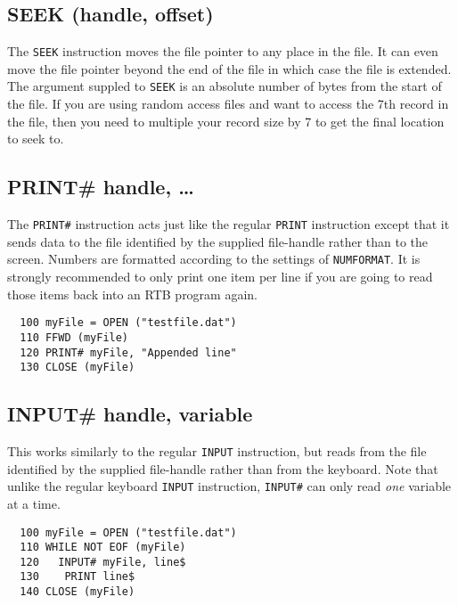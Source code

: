\subsection*{SEEK (handle, offset)}
The {\tt SEEK} instruction moves the file pointer to any place in the
file. It can even move the file pointer beyond the end of the file in
which case the file is extended. The argument suppled to {\tt SEEK}
is an absolute number of bytes from the start of the file. If you are
using random access files and want to access the 7th record in the file,
then you need to multiple your record size by 7 to get the final location
to seek to.

\subsection*{PRINT\# handle, \dots}
The {\tt PRINT\#} instruction acts just like the regular {\tt PRINT}
instruction except that it sends data to the file identified by the
supplied file-handle rather than to the screen. Numbers are formatted
according to the settings of {\tt NUMFORMAT}. It is strongly recommended
to only print one item per line if you are going to read those items
back into an RTB program again.
\begin{verbatim}
  100 myFile = OPEN ("testfile.dat")
  110 FFWD (myFile)
  120 PRINT# myFile, "Appended line"
  130 CLOSE (myFile)
\end{verbatim}

\subsection*{INPUT\# handle, variable}
This works similarly to the regular {\tt INPUT} instruction, but reads
from the file identified by the supplied file-handle rather than from the
keyboard. Note that unlike the regular keyboard {\tt INPUT} instruction,
{\tt INPUT\#} can only read {\em one} variable at a time.
\begin{verbatim}
  100 myFile = OPEN ("testfile.dat")
  110 WHILE NOT EOF (myFile)
  120   INPUT# myFile, line$
  130    PRINT line$
  140 CLOSE (myFile)
\end{verbatim}
